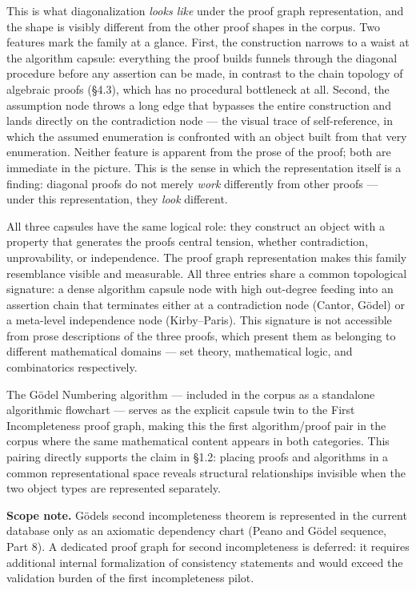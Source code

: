 \documentclass[
  11pt]{article}
\begin{document}
This is what diagonalization \emph{looks like} under the proof graph
representation, and the shape is visibly different from the other proof
shapes in the corpus. Two features mark the family at a glance. First,
the construction narrows to a waist at the algorithm capsule: everything
the proof builds funnels through the diagonal procedure before any
assertion can be made, in contrast to the chain topology of algebraic
proofs (§4.3), which has no procedural bottleneck at all. Second, the
assumption node throws a long edge that bypasses the entire construction
and lands directly on the contradiction node --- the visual trace of
self-reference, in which the assumed enumeration is confronted with an
object built from that very enumeration. Neither feature is apparent
from the prose of the proof; both are immediate in the picture. This is
the sense in which the representation itself is a finding: diagonal
proofs do not merely \emph{work} differently from other proofs --- under
this representation, they \emph{look} different.

All three capsules have the same logical role: they construct an object
with a property that generates the proof\textquotesingle s central
tension, whether contradiction, unprovability, or independence. The
proof graph representation makes this family resemblance visible and
measurable. All three entries share a common topological signature: a
dense algorithm capsule node with high out-degree feeding into an
assertion chain that terminates either at a contradiction node (Cantor,
Gödel) or a meta-level independence node (Kirby--Paris). This signature
is not accessible from prose descriptions of the three proofs, which
present them as belonging to different mathematical domains --- set
theory, mathematical logic, and combinatorics respectively.

The Gödel Numbering algorithm --- included in the corpus as a standalone
algorithmic flowchart --- serves as the explicit capsule twin to the
First Incompleteness proof graph, making this the first algorithm/proof
pair in the corpus where the same mathematical content appears in both
categories. This pairing directly supports the claim in §1.2: placing
proofs and algorithms in a common representational space reveals
structural relationships invisible when the two object types are
represented separately.

\textbf{Scope note.} Gödel\textquotesingle s second incompleteness
theorem is represented in the current database only as an axiomatic
dependency chart (Peano and Gödel sequence, Part 8). A dedicated proof
graph for second incompleteness is deferred: it requires additional
internal formalization of consistency statements and would exceed the
validation burden of the first incompleteness pilot.
\end{document}
